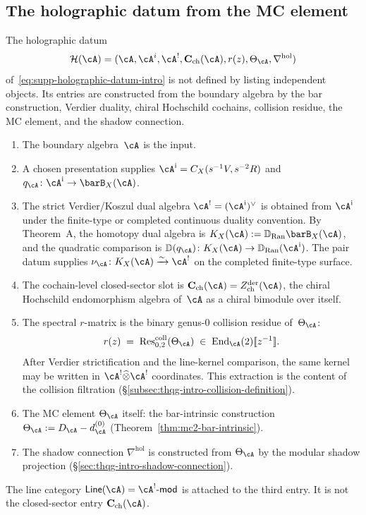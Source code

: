 \subsection{The holographic datum from the MC element}
\label{subsec:thqg-intro-holographic-from-mc}

The holographic datum
\[
\mathcal{H}(\cA)
=
(\cA,\cA^i,\cA^!,\mathbf{C}_{\mathrm{ch}}(\cA),
r(z),\Theta_\cA,\nabla^{\mathrm{hol}})
\]
of~\eqref{eq:supp-holographic-datum-intro} is not defined by listing
independent objects. Its entries are constructed from the boundary
algebra by the bar construction, Verdier duality, chiral Hochschild
cochains, collision residue, the MC element, and the shadow connection.

\begin{enumerate}[label=\textup{(\roman*)}]
\item The boundary algebra~$\cA$ is the input.
\item A chosen presentation supplies
 $\cA^{\mathrm i}=C_X(s^{-1}V,s^{-2}R)$ and
 $q_\cA\colon\cA^{\mathrm i}\to\barB_X(\cA)$.
\item The strict Verdier/Koszul dual algebra
 $\cA^!=(\cA^{\mathrm i})^\vee$ is obtained from
 $\cA^{\mathrm i}$ under the finite-type
 or completed continuous duality convention. By Theorem~A, the
 homotopy dual algebra is
 $K_X(\cA):=\mathbb{D}_{\operatorname{Ran}}\barB_X(\cA)$, and the
 quadratic comparison is
 $\mathbb D(q_\cA)\colon K_X(\cA)\to
 \mathbb D_{\operatorname{Ran}}(\cA^{\mathrm i})$. The
 pair datum supplies
 $\nu_{\cA}\colon K_X(\cA)\xrightarrow{\sim}\cA^!$ on the completed
 finite-type surface.
\item The cochain-level closed-sector slot is
 $\mathbf{C}_{\mathrm{ch}}(\cA)
 =Z^{\mathrm{der}}_{\mathrm{ch}}(\cA)$, the chiral Hochschild
 endomorphism algebra of~$\cA$ as a chiral bimodule over itself.
\item The spectral $r$-matrix is the binary genus-$0$ collision residue
 of~$\Theta_\cA$:
 \begin{equation}\label{eq:thqg-intro-r-matrix-extraction}
 r(z) \;=\; \operatorname{Res}^{\mathrm{coll}}_{0,2}(\Theta_\cA)
 \;\in\;
 \mathrm{End}_{\cA}(2)[\![z^{-1}]\!].
 \end{equation}
 After Verdier strictification and the line-kernel comparison, the
 same kernel may be written in $\cA^!\widehat{\otimes}\cA^!$
 coordinates.
 This extraction is the content of the collision filtration
 (\S\ref{subsec:thqg-intro-collision-definition}).
\item The MC element $\Theta_\cA$ itself: the bar-intrinsic
 construction $\Theta_\cA := D_\cA - d_\cA^{(0)}$
 (Theorem~\ref{thm:mc2-bar-intrinsic}).
\item The shadow connection $\nabla^{\mathrm{hol}}$ is constructed
 from $\Theta_\cA$ by the modular shadow projection
 (\S\ref{sec:thqg-intro-shadow-connection}).
\end{enumerate}
The line category
$\mathsf{Line}(\cA)=\cA^!\text{-}\mathsf{mod}$
is attached to the third entry. It is not the closed-sector entry
$\mathbf{C}_{\mathrm{ch}}(\cA)$.

